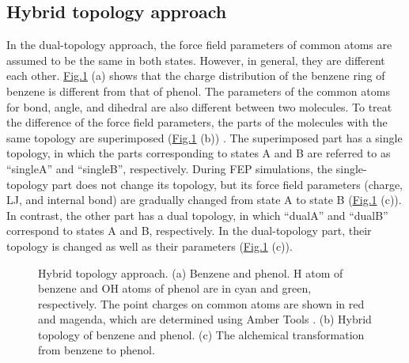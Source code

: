 \documentclass[a4paper,11pt,oneside,english]{sphinxmanual}
\begin{document}
\subsection{Hybrid topology approach}
\label{\detokenize{20_Alchemy:hybrid-topology-approach}}
In the dual-topology approach, the force field parameters of common atoms are assumed to be the same in both states.
However, in general, they are different each other. \hyperref[\detokenize{20_Alchemy:hybrid-topology}]{Fig.\@ \ref{\detokenize{20_Alchemy:hybrid-topology}}} (a) shows that the charge distribution of the benzene ring of benzene is different from that of phenol.
The parameters of the common atoms for bond, angle, and dihedral are also different between two molecules.
To treat the difference of the force field parameters, the parts of the molecules with the same topology are superimposed (\hyperref[\detokenize{20_Alchemy:hybrid-topology}]{Fig.\@ \ref{\detokenize{20_Alchemy:hybrid-topology}}} (b)) .
The superimposed part has a single topology, in which the parts corresponding to states A and B are referred to as “singleA” and “singleB”, respectively.
During FEP simulations, the single-topology part does not change its topology, but its force field parameters (charge, LJ, and internal bond) are gradually changed from state A to state B (\hyperref[\detokenize{20_Alchemy:hybrid-topology}]{Fig.\@ \ref{\detokenize{20_Alchemy:hybrid-topology}}} (c)).
In contrast, the other part has a dual topology, in which “dualA” and “dualB” correspond to states A and B, respectively.
In the dual-topology part, their topology is changed as well as their parameters (\hyperref[\detokenize{20_Alchemy:hybrid-topology}]{Fig.\@ \ref{\detokenize{20_Alchemy:hybrid-topology}}} (c)).

\begin{figure}[htbp]
\centering
\capstart

\noindent{}
\caption{Hybrid topology approach. (a) Benzene and phenol. H atom of benzene and OH atoms of phenol are in cyan and green, respectively. The point charges on common atoms are shown in red and magenda, which are determined using Amber Tools . (b) Hybrid topology of benzene and phenol. (c) The alchemical transformation from benzene to phenol.}\label{\detokenize{20_Alchemy:hybrid-topology}}\end{figure}
\end{document}
